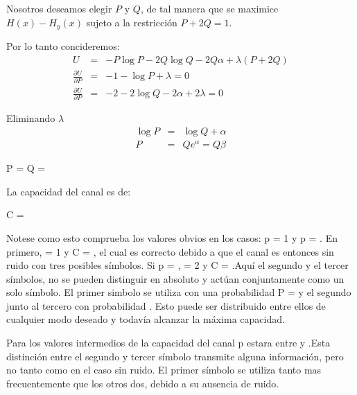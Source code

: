 Nosotros deseamos elegir $P$ y $Q$, de tal manera que se maximice
$H(x) - H_y(x)$ sujeto a la restricci\'on $P + 2Q = 1$.

Por lo tanto concideremos:
\begin{equation}
\begin{array}{rcl}
U &=& -P\log{P} - 2Q\log{Q} -2Q\alpha + \lambda(P+2Q) \\
\frac{{\partial U}}{{\partial P}} &=& -1 - \log{P} + \lambda = 0 \\
\frac{{\partial U}}{{\partial P}} &=& -2 - 2\log{Q} -2\alpha + 2\lambda = 0
\end{array}
\end{equation}

Eliminando $\lambda$
\begin{equation}
\begin{array}{rcl}
\log{P} &=& \log{Q} + \alpha \\
P &=& Q e^\alpha = Q\beta 
\end{array}
\end{equation}

\begin{center}
P =    Q = 
\end{center}

La capacidad del canal es de:

\begin{center}
C = 
\end{center}

Notese como esto comprueba los valores obvios en los casos: p = 1 y p = . En primero, \beta = 1 y C = , 
el cual es correcto debido a que el canal es entonces sin ruido con tres posibles s\'imbolos. Si p = , \beta = 2 y 
C = .Aqu\'i el segundo y el tercer s\'imbolos, no se pueden distinguir en absoluto y act\'uan conjuntamente como un solo 
s\'imbolo. El primer simbolo se utiliza con una probabilidad P =   y el segundo junto al tercero con probabilidad .
Esto puede ser distribuido entre ellos de cualquier modo deseado y todav\'ia alcanzar la m\'axima capacidad.

Para los valores intermedios de la capacidad del canal p estara entre  y .Esta distinci\'on 
entre el segundo y tercer s\'imbolo transmite alguna informaci\'on, pero no tanto como en el caso sin ruido.
El primer s\'imbolo se utiliza tanto mas frecuentemente que los otros dos, debido a su ausencia de ruido.


